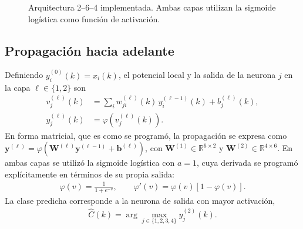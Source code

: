 \documentclass[conference]{IEEEtran}
\begin{document}
\begin{figure}[htbp]
\centering
{}
\caption{Arquitectura 2--6--4 implementada. Ambas capas utilizan la
sigmoide logística como función de activación.}
\label{fig:arq}
\end{figure}

\subsection{Propagación hacia adelante}
Definiendo $y_i^{(0)}(k)=x_i(k)$, el potencial local y la salida de la
neurona $j$ en la capa $\ell\in\{1,2\}$ son
\begin{align}
    \label{eq:v}
    v_j^{(\ell)}(k)&=\sum_{i} w_{ji}^{(\ell)}(k)\,y_i^{(\ell-1)}(k)+b_j^{(\ell)}(k),\\
    \label{eq:y}
    y_j^{(\ell)}(k)&=\varphi\!\left(v_j^{(\ell)}(k)\right).
\end{align}
En forma matricial, que es como se programó, la propagación se expresa
como $\mathbf{y}^{(\ell)}=\varphi\!\left(\mathbf{W}^{(\ell)}\mathbf{y}^{(\ell-1)}+\mathbf{b}^{(\ell)}\right)$,
con $\mathbf{W}^{(1)}\in\mathbb{R}^{6\times2}$ y
$\mathbf{W}^{(2)}\in\mathbb{R}^{4\times6}$. En ambas capas se utilizó la
sigmoide logística con $a=1$, cuya derivada se programó explícitamente en
términos de su propia salida:
\begin{align}
    \label{eq:sigmoide}
    \varphi(v)=\frac{1}{1+e^{-v}},\qquad \varphi'(v)=\varphi(v)\left[1-\varphi(v)\right].
\end{align}
La clase predicha corresponde a la neurona de salida con mayor activación,
\begin{align}
    \label{eq:argmax}
    \hat{C}(k)=\arg\max_{j\in\{1,2,3,4\}} y_j^{(2)}(k).
\end{align}
\end{document}
